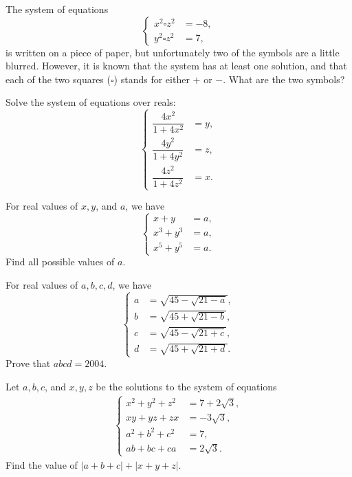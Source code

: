 \begin{question}[name={2017 Denmark (Georg Mohr)}]
    The system of equations
    \[\begin{cases}
        x^2 \square z^2 &= -8,\\ y^2 \square z^2 &= 7,
    \end{cases}\]
    is written on a piece of paper, but unfortunately two of the symbols are a little blurred. However, it is known that the system has at least one solution, and that each of the two squares ($\square$) stands for either $+$ or $-$. What are the two symbols?
\end{question}

\begin{question}[name={1999 Switzerland TST}]
    Solve the system of equations over reals:
    \[\begin{cases}
        \dfrac{4x^2}{1+4x^2} &= y, \\ \dfrac{4y^2}{1+4y^2} &= z,\\ \dfrac{4z^2}{1+4z^2} &= x.
    \end{cases}\]
\end{question}


\begin{question}[name={2003 Switzerland TST}]
    For real values of $x,y$, and $a$, we have
    \[\begin{cases}
        x + y  &= a, \\ x^3 + y^3  &= a,\\ x^5 + y^5  &= a.
    \end{cases}\]
    Find all possible values of $a$.
\end{question}



\begin{question}[name={2004 Switzerland TST}]
    For real values of $a,b,c,d$, we have
    \[\begin{cases}
        a  &= \sqrt{45-\sqrt{21-a}}, \\ b  &= \sqrt{45+\sqrt{21-b}},\\ c  &= \sqrt{45-\sqrt{21+c}},\\ d  &= \sqrt{45+\sqrt{21+d}}.
    \end{cases}\]
    Prove that $abcd=2004$.
\end{question}


\begin{question}[name={2007 Ecuador TST}]
    Let $a,b,c$, and $x,y,z$ be the solutions to the system of equations
    \begin{align*}
        \begin{cases}
            x^2+y^2+z^2 &= 7+2\sqrt{3},\\
            xy+yz+zx &= -3\sqrt{3},\\
            a^2+b^2+c^2 &= 7,\\
            ab+bc+ca &= 2\sqrt{3}.
        \end{cases}
    \end{align*}
    Find the value of $|a+b+c|+|x+y+z|$.
\end{question}


